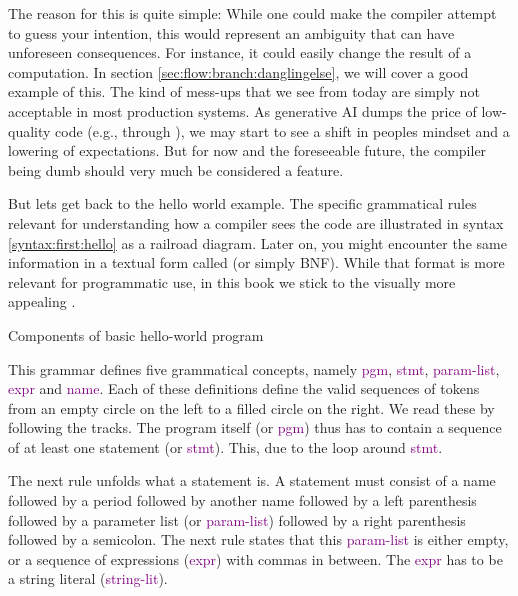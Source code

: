 The reason for this is quite simple: While one could make the compiler attempt to guess your intention, this would represent an ambiguity that can have unforeseen consequences. For instance, it could easily change the result of a computation. In section \ref{sec:flow:branch:danglingelse}, we will cover a good example of this. The kind of mess-ups that we see from  today are simply not acceptable in most production systems. As generative AI dumps the price of low-quality code (e.g., through ), we may start to see a shift in peoples mindset and a lowering of expectations. But for now and the foreseeable future, the compiler being dumb should very much be considered a feature.

But lets get back to the hello world example. The specific grammatical rules relevant for understanding how a compiler sees the code are illustrated in syntax \ref{syntax:first:hello} as a railroad diagram. Later on, you might encounter the same information in a textual form called  (or simply BNF). While that format is more relevant for programmatic use, in this book we stick to the visually more appealing .

\begin{syntaxfloat}
  
  \caption{Components of basic hello-world program}
  \label{syntax:first:hello}
\end{syntaxfloat}

This grammar defines five grammatical concepts, namely \textcolor{purple}{pgm}, \textcolor{purple}{stmt}, \textcolor{purple}{param-list}, \textcolor{purple}{expr} and \textcolor{purple}{name}. Each of these definitions define the valid sequences of tokens from an empty circle on the left to a filled circle on the right. We read these by following the tracks. The program itself (or \textcolor{purple}{pgm}) thus has to contain a sequence of at least one statement (or \textcolor{purple}{stmt}). This, due to the loop around \textcolor{purple}{stmt}. %

The next rule unfolds what a statement is. A statement must consist of a name followed by a period followed by another name followed by a left parenthesis followed by a parameter list (or \textcolor{purple}{param-list}) followed by a right parenthesis followed by a semicolon. The next rule states that this \textcolor{purple}{param-list} is either empty, or a sequence of expressions (\textcolor{purple}{expr}) with commas in between. The \textcolor{purple}{expr} has to be a string literal (\textcolor{purple}{string-lit}).

